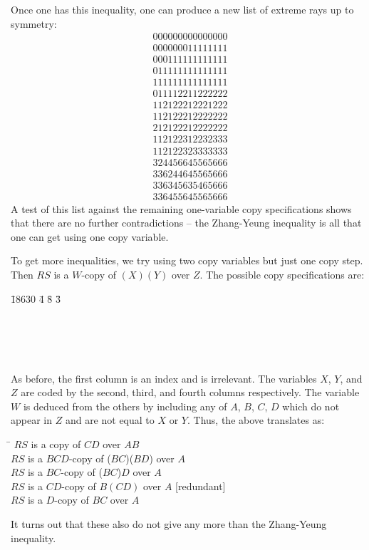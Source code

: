 \documentclass[10pt,journal]{IEEEtran}
\begin{document}
Once one has this inequality, one can produce a new list of extreme rays up to symmetry:
\begin{eqnarray}\label{newList}
0 0 0 0 0 0 0 0 0 0 0 0 0 0 0\\
\nonumber 0 0 0 0 0 0 0 1 1 1 1 1 1 1 1\\
\nonumber  0 0 0 1 1 1 1 1 1 1 1 1 1 1 1\\
\nonumber  0 1 1 1 1 1 1 1 1 1 1 1 1 1 1\\
\nonumber  1 1 1 1 1 1 1 1 1 1 1 1 1 1 1\\
\nonumber  0 1 1 1 1 2 2 1 1 2 2 2 2 2 2\\
\nonumber  1 1 2 1 2 2 2 1 2 2 2 1 2 2 2\\
\nonumber  1 1 2 1 2 2 2 1 2 2 2 2 2 2 2\\
\nonumber  2 1 2 1 2 2 2 1 2 2 2 2 2 2 2\\
\nonumber  1 1 2 1 2 2 3 1 2 2 3 2 3 3 3\\
\nonumber  1 1 2 1 2 2 3 2 3 3 3 3 3 3 3\\
\nonumber  3 2 4 4 5 6 6 4 5 5 6 5 6 6 6\\
\nonumber  3 3 6 2 4 4 6 4 5 5 6 5 6 6 6\\
\nonumber  3 3 6 3 4 5 6 3 5 4 6 5 6 6 6\\
\nonumber  3 3 6 4 5 5 6 4 5 5 6 5 6 6 6
\end{eqnarray}
A test of this list against the remaining one-variable copy specifications shows that
there are no further contradictions -- the Zhang-Yeung inequality is all
that one can get using one copy variable.

To get more inequalities, we try using two copy variables but just one copy step.
Then $RS$ is a $W$-copy of $(X)(Y)$ over $Z$.
The possible copy specifications are:
\begin{tabbing}
       \qquad \qquad \qquad \qquad \= 18630 \qquad \= 4 \qquad \= 8 \qquad \= 3\\
           \\
          \\
          \\
          \\
\end{tabbing}
As before, the first column is an index and is irrelevant.
The variables $X$, $Y$, and $Z$ are coded by the second, third, and fourth columns respectively.
The variable $W$ is deduced from the others by including any of $A$, $B$, $C$, $D$ which do not
appear in $Z$ and are not equal to $X$ or $Y$.  Thus, the above translates as:
\begin{tabbing}
    \qquad \= $RS$ is a copy of $CD$ over $AB$\\
    \>  $RS$ is a $BCD$-copy of ($BC$)($BD$) over $A$\\
     \> $RS$ is a $BC$-copy of ($BC$)$D$ over $A$\\
    \>  $RS$ is a $CD$-copy of $B(CD)$ over $A$      [redundant]\\
    \>  $RS$ is a $D$-copy of $BC$ over $A$\\
\end{tabbing}
It turns out that these also do not give any more than the Zhang-Yeung inequality.
\end{document}
